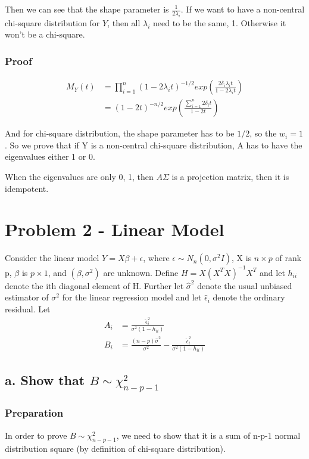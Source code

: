 Then we can see that the shape parameter is $\frac{1}{2 \lambda_i}$. If we want to have a non-central chi-square distribution for $Y$, then all $\lambda_i$ need to be the same, 1. Otherwise it won't be a chi-square. 

\subsubsection{Proof}

\begin{align*}
	M_Y(t) &= \prod_{i=1}^n  (1-2 \lambda_i t)^{-1/2} exp \left( \frac{ 2 \delta_i \lambda_i t }{1-2 \lambda_i t} \right) \\
	&= (1-2 t)^{-n/2} exp \left( \frac{ \sum_{i=1}^n 2 \delta_i t }{1-2  t} \right) 
\end{align*}

And for chi-square distribution, the shape parameter has to be $1/2$, so the $w_i = 1$. So we prove that if Y is a non-central chi-square distribution, A has to have the eigenvalues either 1 or 0. 

When the eigenvalues are only 0, 1, then $A\Sigma$ is a projection matrix, then it is idempotent.


\section{Problem 2 - Linear Model}
Consider the linear model $Y = X \beta + \epsilon$, where $\epsilon \sim N_n(0, \sigma^2 I)$, X is $n \times p$ of rank p, $\beta$ is $p \times 1$, and $(\beta, \sigma^2)$ are unknown. Define $H = X(X^TX)^{-1}X^T$ and let $h_{ii}$ denote the ith diagonal element of H. Further let $\hat{\sigma}^2$ denote the usual unbiased estimator of $\sigma^2$ for the linear regression model and let $\hat{\epsilon}_i$ denote the ordinary residual. Let 
\begin{align*}
	A_i & = \frac{\hat{\epsilon}_i^2}{\sigma^2(1-h_{ii})} \\
	B_i & = \frac{(n-p)\hat{\sigma}^2 }{\sigma^2} - \frac{\hat{\epsilon}_i^2}{\sigma^2(1-h_{ii})}
\end{align*}

\subsection{a. Show that $B \sim \chi^2_{n-p-1}$}

\subsubsection{Preparation}
In order to prove $B \sim \chi^2_{n-p-1}$, we need to show that it is a sum of n-p-1 normal distribution square (by definition of chi-square distribution). 

